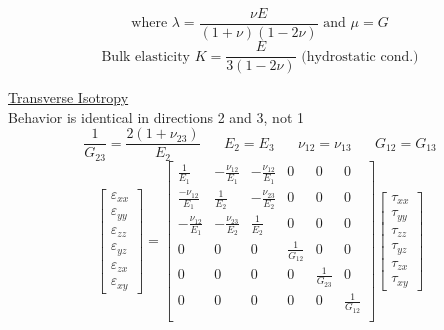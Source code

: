 \documentclass[twocolumn, 12pt]{article}    %
\begin{document}
\begin{equation*}
    \text{where     } \lambda =\frac{\nu E}{(1+\nu)(1-2\nu)} \text{     and     } \mu = G
\end{equation*}
\begin{equation*}
    \text{Bulk elasticity }K = \frac{E}{3(1-2\nu)} \text{ (hydrostatic cond.)}
\end{equation*}


\underline{Transverse Isotropy}\\
Behavior is identical in directions 2 and 3, not 1
\begin{equation*}
    \frac{1}{G_{23}} = \frac{2(1+\nu_{23})}{E_2} \hspace{20pt} E_2=E_3 \hspace{20pt} \nu_{12} =\nu_{13} \hspace{20pt}G_{12}=G_{13}
\end{equation*}
\begin{equation*}
    \begin{bmatrix}
        \varepsilon_{xx} \\
        \varepsilon_{yy}\\
        \varepsilon_{zz}\\
        \varepsilon_{yz}\\
        \varepsilon_{zx}\\
        \varepsilon_{xy}
    \end{bmatrix} = 
    \begin{bmatrix}
        \frac{1}{E_1} & -\frac{\nu_{12}}{E_1} & -\frac{\nu_{12}}{E_1} &0 &0 &0\\
        \frac{-\nu_{12}}{E_1} & \frac{1}{E_2} & -\frac{\nu_{23}}{E_2} &0 &0 &0\\
        -\frac{\nu_{12}}{E_1} & -\frac{\nu_{23}}{E_2} & \frac{1}{E_2} &0 &0 &0\\
        0& 0 &0 &\frac{1}{G_{12}} &0 &0\\
        0& 0 &0 &0 &\frac{1}{G_{23}} &0 \\
        0 &0 &0 &0 &0 &\frac{1}{G_{12}}\\
    \end{bmatrix}
    \begin{bmatrix}
        \tau_{xx}\\
        \tau_{yy}\\
        \tau_{zz}\\
        \tau_{yz}\\
        \tau_{zx}\\
        \tau_{xy}
    \end{bmatrix}
\end{equation*}
\end{document}
